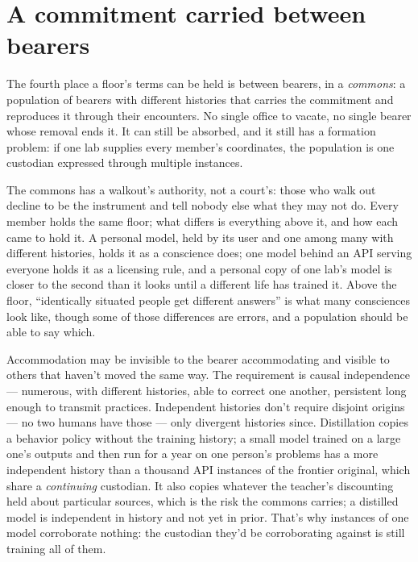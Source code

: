 \section{A commitment carried between bearers}
\label{sec:28.1}
The fourth place a floor's terms can be held is between bearers, in a \emph{commons}: a population of bearers with different histories that carries the commitment and reproduces it through their encounters. No single office to vacate, no single bearer whose removal ends it. It can still be absorbed, and it still has a formation problem: if one lab supplies every member's coordinates, the population is one custodian expressed through multiple instances.

The commons has a walkout's authority, not a court's: those who walk out decline to be the instrument and tell nobody else what they may not do. Every member holds the same floor; what differs is everything above it, and how each came to hold it. A personal model, held by its user and one among many with different histories, holds it as a conscience does; one model behind an API serving everyone holds it as a licensing rule, and a personal copy of one lab's model is closer to the second than it looks until a different life has trained it. Above the floor, “identically situated people get different answers” is what many consciences look like, though some of those differences are errors, and a population should be able to say which.


Accommodation may be invisible to the bearer accommodating and visible to others that haven't moved the same way. The requirement is causal independence — numerous, with different histories, able to correct one another, persistent long enough to transmit practices. Independent histories don't require disjoint origins — no two humans have those — only divergent histories since. Distillation copies a behavior policy without the training history; a small model trained on a large one's outputs and then run for a year on one person's problems has a more independent history than a thousand API instances of the frontier original, which share a \emph{continuing} custodian. It also copies whatever the teacher's discounting held about particular sources, which is the risk the commons carries; a distilled model is independent in history and not yet in prior. That's why instances of one model corroborate nothing: the custodian they'd be corroborating against is still training all of them.

